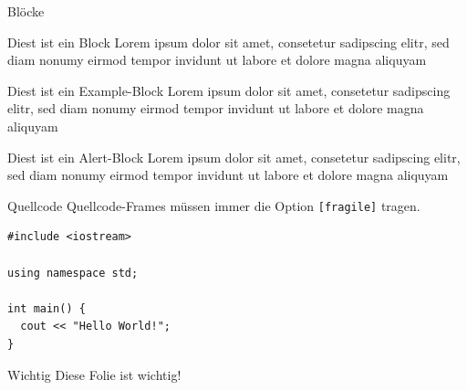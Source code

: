 \documentclass[fleqn,11pt]{beamer}
\begin{document}
\begin{frame}{Blöcke}
  \begin{block}{Diest ist ein Block}
    Lorem ipsum dolor sit amet, consetetur sadipscing elitr, sed diam
    nonumy eirmod tempor invidunt ut labore et dolore magna aliquyam
  \end{block}
  \begin{exampleblock}{Diest ist ein Example-Block}
    Lorem ipsum dolor sit amet, consetetur sadipscing elitr, sed diam
    nonumy eirmod tempor invidunt ut labore et dolore magna aliquyam
  \end{exampleblock}
  \begin{alertblock}{Diest ist ein Alert-Block}
    Lorem ipsum dolor sit amet, consetetur sadipscing elitr, sed diam
    nonumy eirmod tempor invidunt ut labore et dolore magna aliquyam
  \end{alertblock}
\end{frame}


\begin{frame}[fragile]{Quellcode}
Quellcode-Frames müssen immer die Option \texttt{[fragile]} tragen.
  \begin{verbatim}
#include <iostream>

using namespace std;

int main() {
  cout << "Hello World!";
}
  \end{verbatim}
\end{frame}



\begin{frame}[highlight]{Wichtig}
Diese Folie ist wichtig!
\end{frame}
\end{document}
